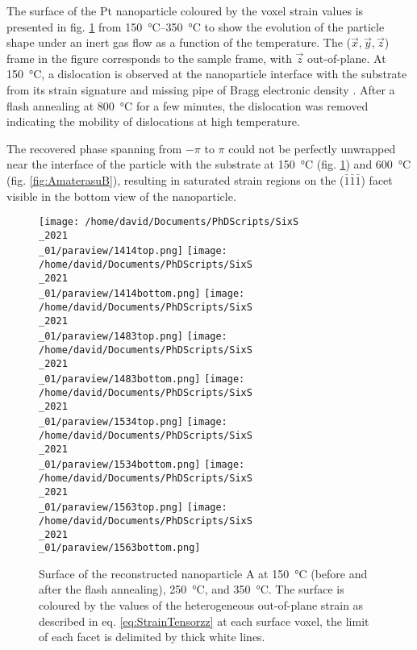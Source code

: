The surface of the Pt nanoparticle coloured by the voxel strain values is presented in fig. \ref{fig:AmaterasuA} from \qtyrange{150}{350}{\degreeCelsius} to show the evolution of the particle shape under an inert gas flow as a function of the temperature.
The ($\vec{x}, \vec{y}, \vec{z}$) frame in the figure corresponds to the sample frame, with $\vec{z}$ out-of-plane.
At \qty{150}{\degreeCelsius}, a dislocation is observed at the nanoparticle interface with the substrate from its strain signature and missing pipe of Bragg electronic density \parencite{Dupraz2015}.
After a flash annealing at \qty{800}{\degreeCelsius} for a few minutes, the dislocation was removed indicating the mobility of dislocations at high temperature.

The recovered phase spanning from $-\pi$ to $\pi$ could not be perfectly unwrapped near the interface of the particle with the substrate at \qty{150}{\degreeCelsius} (fig. \ref{fig:AmaterasuA}) and \qty{600}{\degreeCelsius} (fig. \ref{fig:AmaterasuB}), resulting in saturated strain regions on the ($\bar{1}\bar{1}\bar{1}$) facet visible in the bottom view of the nanoparticle.

\begin{figure}[!htb]
    \centering
    \texttt{[image: /home/david/Documents/PhDScripts/SixS\\\_2021\\\_01/paraview/1414top.png]}
    \texttt{[image: /home/david/Documents/PhDScripts/SixS\\\_2021\\\_01/paraview/1414bottom.png]}
    \texttt{[image: /home/david/Documents/PhDScripts/SixS\\\_2021\\\_01/paraview/1483top.png]}
    \texttt{[image: /home/david/Documents/PhDScripts/SixS\\\_2021\\\_01/paraview/1483bottom.png]}
    \texttt{[image: /home/david/Documents/PhDScripts/SixS\\\_2021\\\_01/paraview/1534top.png]}
    \texttt{[image: /home/david/Documents/PhDScripts/SixS\\\_2021\\\_01/paraview/1534bottom.png]}
    \texttt{[image: /home/david/Documents/PhDScripts/SixS\\\_2021\\\_01/paraview/1563top.png]}
    \texttt{[image: /home/david/Documents/PhDScripts/SixS\\\_2021\\\_01/paraview/1563bottom.png]}
    \caption{
        Surface of the reconstructed nanoparticle A at \qty{150}{\degreeCelsius} (before and after the flash annealing), \qty{250}{\degreeCelsius}, and \qty{350}{\degreeCelsius}.
        The surface is coloured by the values of the heterogeneous out-of-plane strain as described in eq. \ref{eq:StrainTensorzz} at each surface voxel, the limit of each facet is delimited by thick white lines.
    }
    \label{fig:AmaterasuA}
\end{figure}

